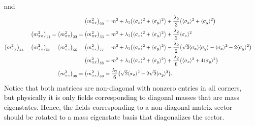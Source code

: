 and
\begin{equation}
\begin{split}
	\big(m^2_{\pi\pi}\big)_{00} &= m^2 + \lambda_1 \big(\avg{\sigma_x}^2 + \avg{\sigma_y}^2\big) + \frac{\lambda_2}{3} \big(\avg{\sigma_x}^2 + \avg{\sigma_y}^2\big) \\
	\big(m^2_{\pi\pi}\big)_{11} =
	\big(m^2_{\pi\pi}\big)_{22} =
	\big(m^2_{\pi\pi}\big)_{33} &= m^2 + \lambda_1 \big(\avg{\sigma_x}^2 + \avg{\sigma_y}^2\big) + \frac{\lambda_2}{2} \avg{\sigma_x}^2 \\
	\big(m^2_{\pi\pi}\big)_{44} =
	\big(m^2_{\pi\pi}\big)_{55} =
	\big(m^2_{\pi\pi}\big)_{66} =
	\big(m^2_{\pi\pi}\big)_{77} &= m^2 + \lambda_1 \big(\avg{\sigma_x}^2 + \avg{\sigma_y}^2\big) - \frac{\lambda_2}{2} \big(\sqrt{2} \avg{\sigma_x} \avg{\sigma_y} - \avg{\sigma_x}^2 - 2 \avg{\sigma_y}^2\big) \\
	\big(m^2_{\pi\pi}\big)_{88} &= m^2 + \lambda_1 \big(\avg{\sigma_x}^2 + \avg{\sigma_y}^2\big) + \frac{\lambda_2}{6} \big(\avg{\sigma_x}^2 + 4 \avg{\sigma_y}^2\big) \\ 
	\big(m^2_{\pi\pi}\big)_{08} =
	\big(m^2_{\pi\pi}\big)_{80} &= \frac{\lambda_2}{6} \big(\sqrt{2} \avg{\sigma_x}^2 - 2 \sqrt{2} \avg{\sigma_y}^2\big).
\end{split}%
\label{eq:lsm3f:mass_pi_pi}
\end{equation}%
Notice that both matrices are non-diagonal with nonzero entries in all corners,
but physically it is only fields corresponding to diagonal masses that are mass eigenstates. \cite{ref:lsm3f_details}
Hence, the fields corresponding to a non-diagonal matrix sector should be rotated to a mass eigenstate basis that diagonalizes the sector.
